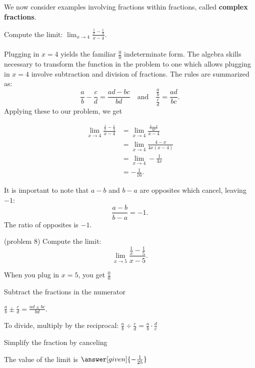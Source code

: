 \documentclass{ximera}
\begin{document}
We now consider examples involving fractions within fractions, called \textbf{complex fractions}.




\begin{example}[example 8]
Compute the limit: $\displaystyle{\lim_{x \to 4} \frac{\frac{1}{x} - \frac{1}{4}}{x-4}}.$ \\
\\
Plugging in $x=4$ yields the familiar $\frac00$ indeterminate form. The algebra skills necessary to transform the 
function in the problem to one which allows plugging in $x=4$ involve subtraction and division of fractions. 
The rules are summarized as:
\[\frac{a}{b} - \frac{c}{d} = \frac{ad-bc}{bd} \quad \text{and} \quad \frac{\frac{a}{b}}{\frac{c}{d}} = \frac{ad}{bc}.\]
Applying these to our problem, we get

\begin{align*}
\lim_{x \to 4} \frac{\frac{1}{x} - \frac{1}{4}}{x-4} &= \lim_{x \to 4} \frac{\frac{4-x}{4x}}{x-4}\\
&=\lim_{x \to 4} \frac{4-x}{4x(x-4)}\\
&= \lim_{x \to 4} -\frac{1}{4x} \\
&= -\frac{1}{16}.
\end{align*}

It is important to note that $a-b$ and $b-a$ are opposites which cancel, leaving $-1$: 
\[ \frac{a-b}{b-a} = -1. \]
The ratio of opposites is $-1$.
\end{example}



\begin{problem}(problem 8)
  Compute the limit:
  \[
  \lim_{x \to 5} \frac{\frac{1}{x} - \frac{1}{5}}{x-5}.
  \]
  
    \begin{hint}
      When you plug in $x = 5$, you get $\frac00$
    \end{hint}
    \begin{hint}
      Subtract the fractions in the numerator
    \end{hint}
    \begin{hint}
      $\frac{a}{b} \pm \frac{c}{d} = \frac{ad \pm bc}{bd}$.
    \end{hint}
    \begin{hint}
      To divide, multiply by the reciprocal: $\frac{a}{b} \div \frac{c}{d} = \frac{a}{b} \cdot \frac{d}{c}$ 
    \end{hint}
    \begin{hint}
      Simplify the fraction by canceling 
    \end{hint}
		The value of the limit is
		 $\answer[given]{-\frac{1}{25}}$
		
\end{problem}
\end{document}

